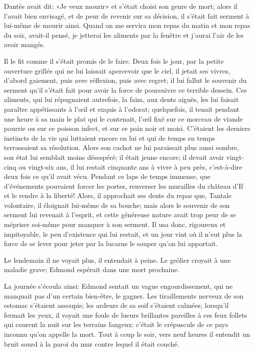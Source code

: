 Dantès avait dit: «Je veux mourir» et s'était choisi son genre de mort; alors il l'avait bien envisagé, et de peur de revenir sur sa décision, il s'était fait serment à lui-même de mourir ainsi. Quand on me servira mon repas du matin et mon repas du soir, avait-il pensé, je jetterai les aliments par la fenêtre et j'aurai l'air de les avoir mangés.

Il le fit comme il s'était promis de le faire. Deux fois le jour, par la petite ouverture grillée qui ne lui laissait apercevoir que le ciel, il jetait ses vivres, d'abord gaiement, puis avec réflexion, puis avec regret; il lui fallut le souvenir du serment qu'il s'était fait pour avoir la force de poursuivre ce terrible dessein. Ces aliments, qui lui répugnaient autrefois, la faim, aux dents aiguës, les lui faisait paraître appétissants à l'œil et exquis à l'odorat; quelquefois, il tenait pendant une heure à sa main le plat qui le contenait, l'œil fixé sur ce morceau de viande pourrie ou sur ce poisson infect, et sur ce pain noir et moisi. C'étaient les derniers instincts de la vie qui luttaient encore en lui et qui de temps en temps terrassaient sa résolution. Alors son cachot ne lui paraissait plus aussi sombre, son état lui semblait moins désespéré; il était jeune encore; il devait avoir vingt-cinq ou vingt-six ans, il lui restait cinquante ans à vivre à peu près, c'est-à-dire deux fois ce qu'il avait vécu. Pendant ce laps de temps immense, que d'événements pouvaient forcer les portes, renverser les murailles du château d'If et le rendre à la liberté! Alors, il approchait ses dents du repas que, Tantale volontaire, il éloignait lui-même de sa bouche; mais alors le souvenir de son serment lui revenait à l'esprit, et cette généreuse nature avait trop peur de se mépriser soi-même pour manquer à son serment. Il usa donc, rigoureux et impitoyable, le peu d'existence qui lui restait, et un jour vint où il n'eut plus la force de se lever pour jeter par la lucarne le souper qu'on lui apportait.

Le lendemain il ne voyait plus, il entendait à peine. Le geôlier croyait à une maladie grave; Edmond espérait dans une mort prochaine.

La journée s'écoula ainsi: Edmond sentait un vague engourdissement, qui ne manquait pas d'un certain bien-être, le gagner. Les tiraillements nerveux de son estomac s'étaient assoupis; les ardeurs de sa soif s'étaient calmées; lorsqu'il fermait les yeux, il voyait une foule de lueurs brillantes pareilles à ces feux follets qui courent la nuit sur les terrains fangeux: c'était le crépuscule de ce pays inconnu qu'on appelle la mort. Tout à coup le soir, vers neuf heures il entendit un bruit sourd à la paroi du mur contre lequel il était couché.

